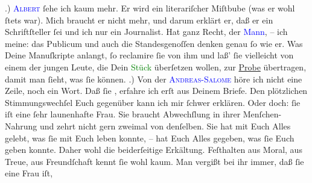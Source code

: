            .) \textsc{\textcolor{blue}{Albert}{}\ledrightnote{\textcolor{blue}{Henri Albert}}} ſehe ich kaum mehr. Er wird ein literariſcher Miſtbube (was er wohl ſtets war).
               Mich braucht er nicht mehr, und darum erklärt er, daß er ein Schriftſteller ſei und ich nur ein Journalist. Hat
               ganz Recht, der \textcolor{blue}{Mann}{}, – ich
               meine: das Publicum und auch die Standesgenoſſen denken genau ſo wie er. Was {\pb}Deine Manuſkripte anlangt, ſo reclamire ſie von ihm
               und laß’ ſie vielleicht von einem der jungen Leute, die Dein \textcolor{green}{Stück}{} überſetzen
               wollen, zur \uline{Probe} übertragen,  damit man ſieht, was ſie können.\pend
           .) Von der \textsc{\textcolor{blue}{Andreas-Salome}{}\ledrightnote{\textcolor{blue}{Lou Andreas-Salomé}}} höre ich nicht eine Zeile, noch ein Wort. Daß ſie \label{K_L02774-11v}\label{K_L02774-11h}, erfahre ich erſt
               aus Deinem Briefe. Den plötzlichen Stimmungswechſel Euch gegenüber kann ich mir
               ſchwer {\pb}erklären. Oder doch: ſie iſt eine ſehr
               launenhafte Frau. Sie braucht Abwechſlung in \strikeout{\textcolor{gray}{al}} ihrer Menſchen-Nahrung und zehrt nicht gern zweimal von denſelben. Sie hat mit
               Euch Alles gelebt, was ſie mit Euch leben konnte, – hat Euch Alles gegeben, was ſie
               Euch geben konnte. Daher wohl die beiderſeitige Erkältung. Feſthalten aus Moral, aus
               Treue, aus Freundſchaft {\pb}kennt ſie wohl kaum.  Man vergißt bei ihr immer, daß ſie eine Frau iſt,
